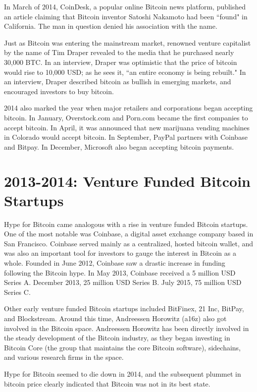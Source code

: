 \documentclass[11pt]{article}
\begin{document}
    In March of 2014, CoinDesk, a popular online Bitcoin news platform, published an article claiming that Bitcoin inventor Satoshi Nakamoto had been ``found" in California. The man in question denied his association with the name.
    
    Just as Bitcoin was entering the mainstream market, renowned venture capitalist by the name of Tim Draper revealed to the media that he purchased nearly 30,000 BTC. In an interview, Draper was optimistic that the price of bitcoin would rise to 10,000 USD; as he sees it, ``an entire economy is being rebuilt." In an interview, Draper described bitcoin as bullish in emerging markets, and encouraged investors to buy bitcoin.
    
    2014 also marked the year when major retailers and corporations began accepting bitcoin. In January, Overstock.com and Porn.com became the first companies to accept bitcoin. In April, it was announced that new marijuana vending machines in Colorado would accept bitcoin. In September, PayPal partners with Coinbase and Bitpay. In December, Microsoft also began accepting bitcoin payments.
    \section*{2013-2014: Venture Funded Bitcoin Startups} 
    
    Hype for Bitcoin came analogous with a rise in venture funded Bitcoin startups. One of the most notable was Coinbase, a digital asset exchange company based in San Francisco. Coinbase served mainly as a centralized, hosted bitcoin wallet, and was also an important tool for investors to gauge the interest in Bitcoin as a whole. Founded in June 2012, Coinbase saw a drastic increase in funding following the Bitcoin hype. In May 2013, Coinbase received a 5 million USD Series A. December 2013, 25 million USD Series B. July 2015, 75 million USD Series C.
    
    Other early venture funded Bitcoin startups included BitFinex, 21 Inc, BitPay, and Blockstream. Around this time, Andreessen Horowitz (a16z) also got involved in the Bitcoin space. Andreessen Horowitz has been directly involved in the steady development of the Bitcoin industry, as they began investing in Bitcoin Core (the group that maintains the core Bitcoin software), sidechains, and various research firms in the space.
    
    Hype for Bitcoin seemed to die down in 2014, and the subsequent plummet in bitcoin price clearly indicated that Bitcoin was not in its best state. 
    
\end{document}
